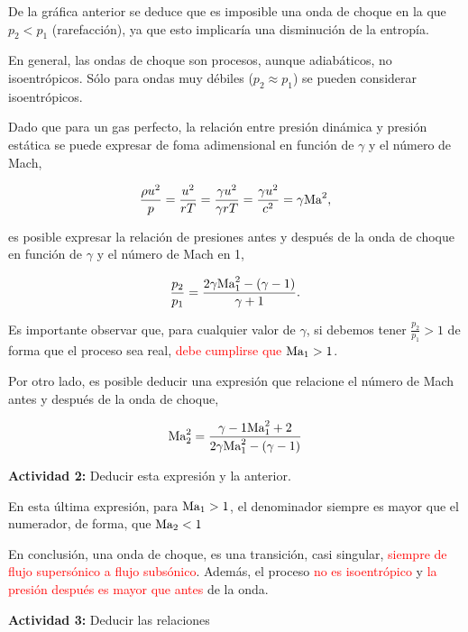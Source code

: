 	
	De la gráfica anterior se deduce que es imposible una onda de choque
	en la que $p_{2}<p_{1}$ (rarefacción), ya que esto implicaría una
	disminución de la entropía.
	
	En general, las ondas de choque son procesos, aunque adiabáticos,
	no isoentrópicos. Sólo para ondas muy débiles ($p_{2}\approx p_{1}$)
	se pueden considerar isoentrópicos.
	
	Dado que para un gas perfecto, la relación entre presión dinámica
	y presión estática se puede expresar de foma adimensional en función
	de $\gamma$ y el número de Mach, 
	
\begin{equation}
		\frac{\rho u^{2}}{p}=\frac{u^{2}}{rT}=\frac{\gamma u^{2}}{\gamma rT}=\frac{\gamma u^{2}}{c^{2}}=\gamma\text{Ma}^{2},
\end{equation}
	
	es posible expresar la relación de presiones antes y después de la
	onda de choque en función de $\gamma$ y el número de Mach en 1, 
	
\begin{equation}		\frac{p_{2}}{p_{1}}=\frac{2\gamma\text{Ma}_{1}^{2}-(\gamma-1)}{\gamma+1}.
\end{equation}
	
	

	
	Es importante observar que, para cualquier valor de $\gamma$, si
	debemos tener $\frac{p_{2}}{p_{1}}>1$ de forma que el proceso sea
	real, \textcolor{red}{debe cumplirse que $\text{Ma}_{1}>1$}.
	
	Por otro lado, es posible deducir una expresión que relacione el número
	de Mach antes y después de la onda de choque, 
	
\begin{equation}
	\text{Ma}_{2}^{2}=\frac{{\gamma-1}\text{Ma}_{1}^{2}+2}{2\gamma\text{Ma}_{1}^{2}-(\gamma-1)}
\end{equation}
	
	
	\textbf{Actividad 2:} Deducir esta expresión y la anterior.

	En esta última expresión, para $\text{Ma}_{1}>1$, el denominador siempre
	es mayor que el numerador, de forma, que $\text{Ma}_{2}<1$

	
	En conclusión, una onda de choque, es una transición, casi singular,
	\textcolor{red}{siempre de flujo supersónico a flujo subsónico}. Además,
	el proceso \textcolor{red}{no es isoentrópico} y \textcolor{red}{la
		presión después es mayor que antes} de la onda. 

	\textbf{Actividad 3:} Deducir las relaciones
		

